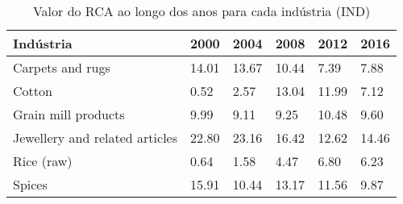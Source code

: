 \begin{table}
\centering
\caption{Valor do RCA ao longo dos anos para cada indústria (IND)}
\label{tab:ex3-tempo-IND}
\begin{tabular}{p{6cm}p{1.5cm}p{1.5cm}p{1.5cm}p{1.5cm}p{1.5cm}}
\toprule
                     Indústria &  2000 &  2004 &  2008 &  2012 &  2016 \\
\midrule
              Carpets and rugs & 14.01 & 13.67 & 10.44 &  7.39 &  7.88 \\
                        Cotton &  0.52 &  2.57 & 13.04 & 11.99 &  7.12 \\
           Grain mill products &  9.99 &  9.11 &  9.25 & 10.48 &  9.60 \\
Jewellery and related articles & 22.80 & 23.16 & 16.42 & 12.62 & 14.46 \\
                    Rice (raw) &  0.64 &  1.58 &  4.47 &  6.80 &  6.23 \\
                        Spices & 15.91 & 10.44 & 13.17 & 11.56 &  9.87 \\
\bottomrule
\end{tabular}
\end{table}
